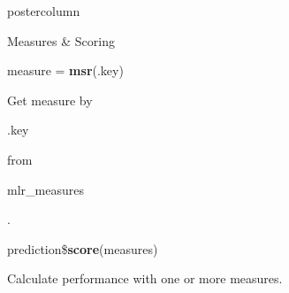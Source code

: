 \documentclass{beamer}
\newcommand{\codeinline}[1]{\begin{codeboxinline}#1\end{codeboxinline}}
\begin{document}
\begin{frame}[fragile]{}
\begin{columns}
\begin{column}{.245\textwidth}
\begin{beamercolorbox}[center]{postercolumn}
\begin{minipage}{.98\textwidth}
{\begin{myblock}{Measures \& Scoring}
							\begin{codebox}
								measure = \textbf{msr}(.key)
							\end{codebox}
							Get measure by \codeinline{.key} from \codeinline{mlr\_measures}.
							\\
							\begin{codebox}
								prediction\$\textbf{score}(measures)
							\end{codebox}
							Calculate performance with one or more measures.
						\end{myblock}
					\vfill}
				\end{minipage}
			\end{beamercolorbox}
		\end{column}
	\end{columns}
\end{frame}
\end{document}
